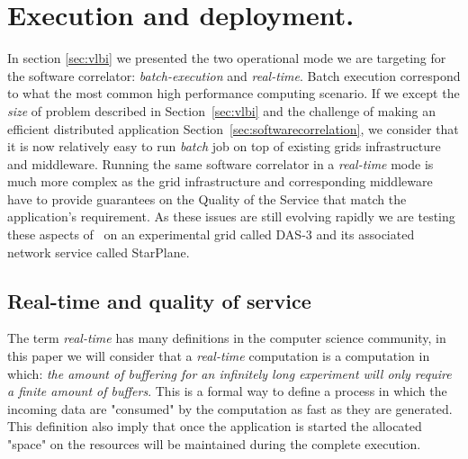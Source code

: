 \section{Execution and deployment.}\label{sec:network}
In section \ref{sec:vlbi} we presented the two operational mode we are
targeting for the software correlator: \emph{batch-execution} and
\emph{real-time}. Batch execution correspond to what the most common
high performance computing scenario.  If we except the \emph{size} of problem described in
Section~\ref{sec:vlbi} and the challenge of making an efficient
distributed application Section~\ref{sec:softwarecorrelation}, we
consider that it is now relatively easy to run \emph{batch} job on top
of existing grids infrastructure and middleware. Running the same
software correlator in a \emph{real-time} mode is much more complex as
the grid infrastructure and corresponding middleware have to provide
guarantees on the Quality of the Service that match the application's
requirement. As these issues are still evolving rapidly we are
testing these aspects of \scarie\ on an experimental grid called DAS-3
and its associated network service called StarPlane.

\subsection{Real-time and quality of service}
The term \emph{real-time} has many definitions in the computer science
community, in this paper we will consider that a \emph{real-time}
computation is a computation in which: \emph{the amount of buffering
  for an infinitely long experiment will only require a finite amount
  of buffers}. This is a formal way to define a process in which the
incoming data are "consumed" by the computation as fast as they are
generated. This definition also imply that once the application is
started the allocated "space" on the resources will be maintained
during the complete execution.

